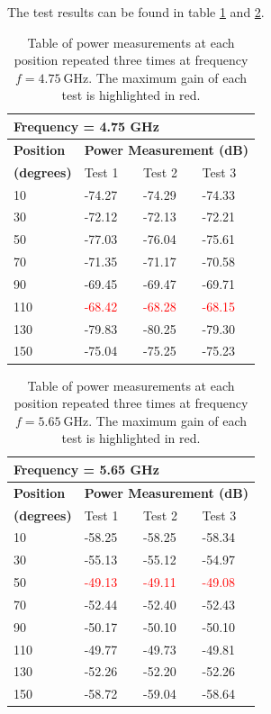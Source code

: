 The test results can be found in table \ref{tab:a2_3a} and \ref{tab:a2_3b}.
\begin{table}[H]
    \centering
    \begin{tabular}{l|l|l|l}
        \multicolumn{4}{l}{\textbf{Frequency = 4.75 GHz}}         \\
        \hline
        \textbf{Position} & \multicolumn{3}{l}{\textbf{Power Measurement (dB)}} \\
        \textbf{(degrees)}  & Test 1    & Test 2  & Test 3  \\
        \hline
        \hline
        10      & -74.27    & -74.29    & -74.33 \\
        30      & -72.12    & -72.13    & -72.21 \\
        50      & -77.03    & -76.04    & -75.61 \\
        70      & -71.35    & -71.17    & -70.58 \\
        90      & -69.45    & -69.47    & -69.71 \\
        110     & \textcolor{red}{-68.42}    & \textcolor{red}{-68.28}    & \textcolor{red}{-68.15} \\
        130     & -79.83    & -80.25    & -79.30 \\
        150     & -75.04    & -75.25    & -75.23
        \end{tabular}
    \caption{Table of power measurements at each position repeated three times at frequency $f=\SI{4.75}{\giga\hertz}$. The maximum gain of each test is highlighted in red.}
    \label{tab:a2_3a}
\end{table}

\begin{table}[H]
    \centering
    \begin{tabular}{l|l|l|l}
        \multicolumn{4}{l}{\textbf{Frequency = 5.65 GHz}}         \\
        \hline
        \textbf{Position} & \multicolumn{3}{l}{\textbf{Power Measurement (dB)}} \\
        \textbf{(degrees)}  & Test 1    & Test 2  & Test 3  \\
        \hline
        \hline
        10      & -58.25    & -58.25    & -58.34 \\
        30      & -55.13    & -55.12    & -54.97 \\
        50      & \textcolor{red}{-49.13}    & \textcolor{red}{-49.11}    & \textcolor{red}{-49.08} \\
        70      & -52.44    & -52.40    & -52.43 \\
        90      & -50.17    & -50.10    & -50.10 \\
        110     & -49.77    & -49.73    & -49.81 \\
        130     & -52.26    & -52.20    & -52.26 \\
        150     & -58.72    & -59.04    & -58.64
        \end{tabular}
    \caption{Table of power measurements at each position repeated three times at frequency $f=\SI{5.65}{\giga\hertz}$. The maximum gain of each test is highlighted in red.}
    \label{tab:a2_3b}
\end{table}


